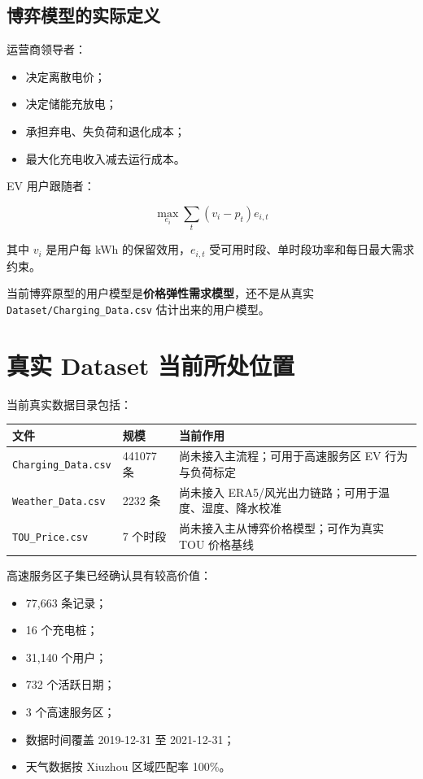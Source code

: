 \documentclass[UTF8,a4paper,11pt]{ctexart}
\begin{document}
\subsection{博弈模型的实际定义}

运营商领导者：

\begin{itemize}
  \item 决定离散电价；
  \item 决定储能充放电；
  \item 承担弃电、失负荷和退化成本；
  \item 最大化充电收入减去运行成本。
\end{itemize}

EV 用户跟随者：

\begin{equation}
\max_{e_i}\sum_t(v_i-p_t)e_{i,t}
\end{equation}

其中 $v_i$ 是用户每 kWh 的保留效用，$e_{i,t}$ 受可用时段、单时段功率和每日最大需求约束。

当前博弈原型的用户模型是\textbf{价格弹性需求模型}，还不是从真实 \texttt{Dataset/Charging\_Data.csv} 估计出来的用户模型。

\section{真实 Dataset 当前所处位置}

当前真实数据目录包括：

\begin{longtable}{p{4.0cm} p{3.1cm} p{6.2cm}}
\toprule
\textbf{文件} & \textbf{规模} & \textbf{当前作用}\\
\midrule
\texttt{Charging\_Data.csv} & 441077 条 & 尚未接入主流程；可用于高速服务区 EV 行为与负荷标定\\
\texttt{Weather\_Data.csv} & 2232 条 & 尚未接入 ERA5/风光出力链路；可用于温度、湿度、降水校准\\
\texttt{TOU\_Price.csv} & 7 个时段 & 尚未接入主从博弈价格模型；可作为真实 TOU 价格基线\\
\bottomrule
\end{longtable}

高速服务区子集已经确认具有较高价值：

\begin{itemize}
  \item 77,663 条记录；
  \item 16 个充电桩；
  \item 31,140 个用户；
  \item 732 个活跃日期；
  \item 3 个高速服务区；
  \item 数据时间覆盖 2019-12-31 至 2021-12-31；
  \item 天气数据按 Xiuzhou 区域匹配率 100\%。
\end{itemize}
\end{document}
